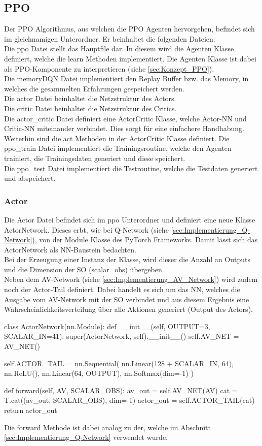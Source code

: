 \subsection{PPO}
Der PPO Algorithmus, aus welchen die PPO Agenten hervorgehen, befindet sich im gleichnamigen Unterordner. Er beinhaltet die folgenden Dateien:\\
Die ppo Datei stellt das Hauptfile dar. In diesem wird die Agenten Klasse definiert, welche die learn Methoden implementiert. Die Agenten Klasse ist dabei als PPO-Komponente zu interpretieren (siehe \ref{sec:Konzept_PPO}).\\
Die memoryDQN Datei implementiert den Replay Buffer bzw. das Memory, in welches die gesammelten Erfahrungen gespeichert werden.\\
Die actor Datei beinhaltet die Netzstruktur des Actors.\\
Die critic Datei beinhaltet die Netzstruktur des Critics.\\
Die actor\_critic Datei definiert eine ActorCritic Klasse, welche Actor-NN und Critic-NN miteinander verbindet. Dies sorgt für eine einfachere Handhabung. Weiterhin sind die act Methoden in der ActorCritic Klasse definiert.
Die ppo\_train Datei implementiert die Trainingsroutine, welche den Agenten trainiert, die Trainingsdaten generiert und diese speichert.\\
Die ppo\_test Datei implementiert die Testroutine, welche die Testdaten generiert und abspeichert.

\subsubsection{Actor}
Die Actor Datei befindet sich im ppo Unterordner und definiert eine neue Klasse ActorNetwork. Dieses erbt, wie bei Q-Network (siehe \ref{sec:Implementierung_Q-Network}), von der Module Klasse des PyTorch Frameworks. Damit lässt sich das ActorNetwork als NN-Baustein bedachten.\\
Bei der Erzeugung einer Instanz der Klasse, wird dieser die Anzahl an Outputs und die Dimension der SO (scalar\_obs) übergeben.\\
Neben dem AV-Network (siehe \ref{sec:Implementierung_AV_Network}) wird zudem noch der Actor-Tail definiert. Dabei handelt es sich um das NN, welches die Ausgabe vom AV-Network mit der SO verbindet und aus diesem Ergebnis eine Wahrscheinlichkeitsverteilung über alle Aktionen generiert (Output des Actors).
\begin{python}
	class ActorNetwork(nn.Module):
		def __init__(self, OUTPUT=3, SCALAR_IN=41):
			super(ActorNetwork, self).__init__()
			self.AV_NET = AV_NET()
			
			self.ACTOR_TAIL = nn.Sequential(
				nn.Linear(128 + SCALAR_IN, 64),
				nn.ReLU(),
				nn.Linear(64, OUTPUT),
				nn.Softmax(dim=-1)
			)
		
		def forward(self, AV, SCALAR_OBS):
			av_out = self.AV_NET(AV)
			cat = T.cat((av_out, SCALAR_OBS), dim=-1)
			actor_out = self.ACTOR_TAIL(cat)
			return actor_out
\end{python}
Die forward Methode ist dabei analog zu der, welche im Abschnitt \ref{sec:Implementierung_Q-Network} verwendet wurde.

